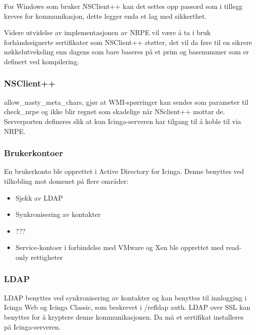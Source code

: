 For Windows som bruker NSClient++ kan det settes opp passord som i tillegg kreves for kommunikasjon, dette legger enda et lag med sikkerthet.

Videre utvidelse av implementasjonen av NRPE vil være å ta i bruk forhåndssignerte sertifikater 
som NSClient++ støtter, det vil da føre til en sikrere nøkkelutveksling enn dagens som bare baseres på et prim og basenummer som er definert ved kompilering.


\subsubsection{NSClient++}
allow\_nasty\_meta\_chars, gjør at WMI-spørringer kan sendes som parameter til check\_nrpe og ikke blir regnet som skadelige når NSclient++ mottar de. Serverporten defineres slik at kun Icinga-serveren har tilgang til å koble til via NRPE.
\subsubsection{Brukerkontoer}
En brukerkonto ble opprettet i Active Directory for Icinga. Denne benyttes ved tilkobling mot domenet på flere områder:
\begin{itemize}
	\item Sjekk av LDAP
	\item Synkronisering av kontakter
	\item ???
	\item Service-kontoer i forbindelse med VMware og Xen ble opprettet med read-only rettigheter
\end{itemize}
\subsubsection{LDAP}
LDAP benyttes ved synkronisering av kontakter og kan benyttes til innlogging i Icinga Web og Icinga Classic, som beskrevet i /ref{ldap auth}. LDAP over SSL kan benyttes for å kryptere denne kommunikasjonen. Da må et sertifikat installeres på Icinga-serveren.
